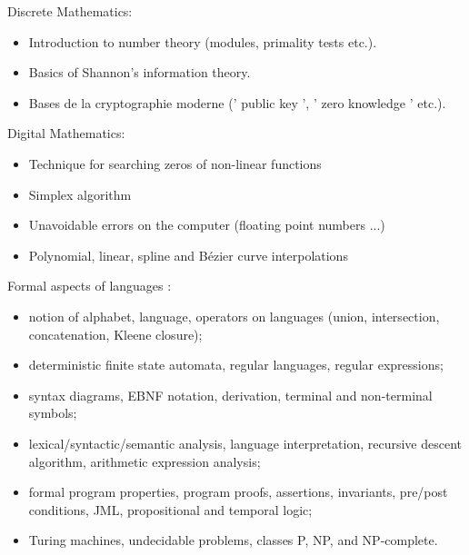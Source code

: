 Discrete Mathematics:
\begin{itemize}
    \item Introduction to number theory (modules, primality tests etc.).
    \item Basics of Shannon's information theory.
    \item Bases de la cryptographie moderne (' public key ', ' zero knowledge ' etc.).
\end{itemize}
Digital Mathematics:
\begin{itemize}
    \item Technique for searching zeros of non-linear functions
    \item Simplex algorithm
    \item Unavoidable errors on the computer (floating point numbers ...)
    \item Polynomial, linear, spline and Bézier curve interpolations
\end{itemize}
\pagebreak
Formal aspects of languages :
\begin{itemize}
    \item notion of alphabet, language, operators on languages (union, intersection, concatenation, Kleene closure);
    \item deterministic finite state automata, regular languages, regular expressions;
    \item syntax diagrams, EBNF notation, derivation, terminal and non-terminal symbols;
    \item lexical/syntactic/semantic analysis, language interpretation, recursive descent algorithm, arithmetic expression analysis;
    \item formal program properties, program proofs, assertions, invariants, pre/post conditions, JML, propositional and temporal logic;
    \item Turing machines, undecidable problems, classes P, NP, and NP-complete.
\end{itemize}